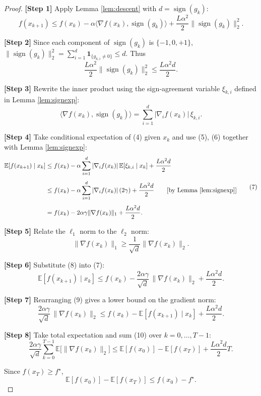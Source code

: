 \documentclass{article}
\newcommand{\sign}{\operatorname{sign}}
\begin{document}
\begin{proof}
\textbf{[Step 1]} Apply Lemma \ref{lem:descent} with $d=\sign(g_k)$:
\[
f(x_{k+1})\le f(x_k)-\alpha\langle\nabla f(x_k),\sign(g_k)\rangle
+\frac{L\alpha^{2}}{2}\|\sign(g_k)\|_{2}^{2}.
\tag{4}
\]

\textbf{[Step 2]} Since each component of $\sign(g_k)$ is $\{-1,0,+1\}$,
$\|\sign(g_k)\|_{2}^{2}= \sum_{i=1}^{d}\mathbf{1}_{\{g_{k,i}\neq0\}}\le d$.
Thus
\[
\frac{L\alpha^{2}}{2}\|\sign(g_k)\|_{2}^{2}\le \frac{L\alpha^{2}d}{2}.
\tag{5}
\]

\textbf{[Step 3]} Rewrite the inner product using the sign‑agreement variable
$\xi_{k,i}$ defined in Lemma \ref{lem:signexp}:
\[
\langle\nabla f(x_k),\sign(g_k)\rangle
=\sum_{i=1}^{d}|\nabla_i f(x_k)|\,\xi_{k,i}.
\tag{6}
\]

\textbf{[Step 4]} Take conditional expectation of (4) given $x_k$ and use (5),
(6) together with Lemma \ref{lem:signexp}:
\[
\begin{aligned}
\mathbb{E}[f(x_{k+1})\mid x_k]
&\le f(x_k)-\alpha\sum_{i=1}^{d}
|\nabla_i f(x_k)|\,\mathbb{E}[\xi_{k,i}\mid x_k]
+\frac{L\alpha^{2}d}{2}\\[4pt]
&\le f(x_k)-\alpha\sum_{i=1}^{d}
|\nabla_i f(x_k)|\,(2\gamma)
+\frac{L\alpha^{2}d}{2}   \qquad\text{[by Lemma \ref{lem:signexp}]}\\[4pt]
&= f(x_k)-2\alpha\gamma\|\nabla f(x_k)\|_{1}
+\frac{L\alpha^{2}d}{2}.
\end{aligned}
\tag{7}
\]

\textbf{[Step 5]} Relate the $\ell_{1}$ norm to the $\ell_{2}$ norm:
\[
\|\nabla f(x_k)\|_{1}\ge\frac{1}{\sqrt{d}}\|\nabla f(x_k)\|_{2}.
\tag{8}
\]

\textbf{[Step 6]} Substitute (8) into (7):
\[
\mathbb{E}[f(x_{k+1})\mid x_k]
\le f(x_k)-\frac{2\alpha\gamma}{\sqrt{d}}\,
\|\nabla f(x_k)\|_{2}
+\frac{L\alpha^{2}d}{2}.
\tag{9}
\]

\textbf{[Step 7]} Rearranging (9) gives a lower bound on the gradient norm:
\[
\frac{2\alpha\gamma}{\sqrt{d}}\,
\|\nabla f(x_k)\|_{2}
\le f(x_k)-\mathbb{E}[f(x_{k+1})\mid x_k]
+\frac{L\alpha^{2}d}{2}.
\tag{10}
\]

\textbf{[Step 8]} Take total expectation and sum (10) over $k=0,\dots,T-1$:
\[
\frac{2\alpha\gamma}{\sqrt{d}}\sum_{k=0}^{T-1}
\mathbb{E}\!\big[\|\nabla f(x_k)\|_{2}\big]
\le
\mathbb{E}[f(x_{0})]-\mathbb{E}[f(x_{T})]
+ \frac{L\alpha^{2}d}{2}T .
\tag{11}
\]

Since $f(x_T)\ge f^{\star}$,
\[
\mathbb{E}[f(x_{0})]-\mathbb{E}[f(x_{T})]\le f(x_{0})-f^{\star}.
\tag{12}
\]


\end{proof}
\end{document}
